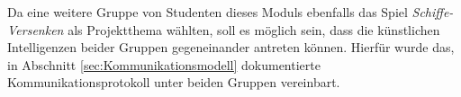 		Da eine weitere Gruppe von Studenten dieses Moduls ebenfalls das Spiel \textit{Schiffe-Versenken} als Projektthema wählten, soll 
		es möglich sein, dass die künstlichen Intelligenzen beider Gruppen gegeneinander antreten können. 
		Hierfür wurde das, in Abschnitt \ref{sec:Kommunikationsmodell} dokumentierte Kommunikationsprotokoll unter beiden Gruppen vereinbart.
